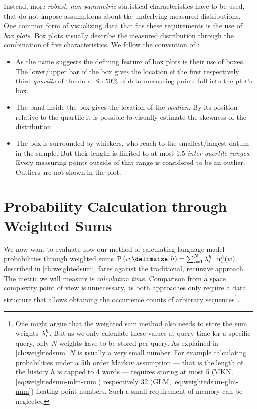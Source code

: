 Instead, more \emph{robust}, \emph{non-parametric} statistical characteristics
have to be used, that do not impose assumptions about the underlying
measured distributions.
One common form of visualizing data that fits these requirements is the use of
\emph{box plots}.
Box plots visually describe the measured distribution through the combination of
five characteristics.
We follow the convention of \textcite{Tukey1977}:
\begin{itemize}
  \item As the name suggests the defining feature of box plots is their use of
    boxes.
    The lower/upper bar of the box gives the location of the first
    respectively third \emph{quartile} of the data.
    So 50\% of data measuring points fall into the plot's box.
  \item The band inside the box gives the location of the \emph{median}.
    By its position relative to the quartile it is possible to visually estimate
    the skewness of the distribution.
  \item The box is surrounded by whiskers, who reach to the smallest/largest
    datum in the sample.
    But their length is limited to at most $1.5$ \emph{inter quartile ranges}.
    Every measuring points outside of that range is considered to be an outlier.
    Outliers are not shown in the plot.
\end{itemize}

\section{Probability Calculation through Weighted Sums}
\label{sec:evaluation-weightedsum}

We now want to evaluate how our method of calculating language model
probabilities through weighted sums
\mbox{$\Prob{w}{h} = \sum_{i = 1}^{N} \SumWeight^h_i \cdot \SumArg_i^h(w)$},
described in \cref{ch:weightedsum}, fares against the traditional, recursive
approach.
The metric we will measure is \emph{calculation time}.
Comparison from a space complexity point of view is unnecessary, as both
approaches only require a data structure that allows obtaining the occurrence
counts of arbitrary sequences\footnote{One might argue that the weighted sum
method also needs to store the sum weights~$\lambda^h_i$. But as we only
calculate these values at query time for a specific query, only $N$ weights have
to be stored per query. As explained in \cref{ch:weightedsum} $N$ is usually a
very small number. For example calculating probabilities under a 5th order
Markov assumption --- that is the length of the history $h$ is capped to 4 words
--- requires storing at most 5 (MKN, \cref{eq:weightedsum-mkn-num}) respectively
32 (GLM, \cref{eq:weightedsum-glm-num}) floating point numbers.
Such a small requirement of memory can be neglected}.

